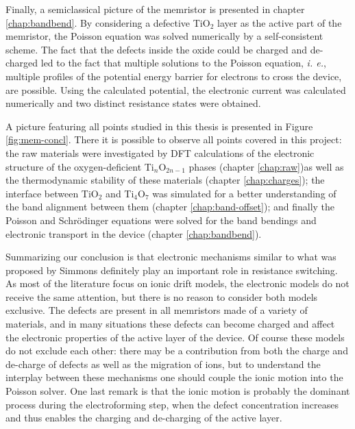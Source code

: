  Finally, a semiclassical picture of the memristor is presented in chapter \ref{chap:bandbend}. By considering a defective TiO$_2$ layer as the active part of the memristor, the Poisson equation was solved numerically by a self-consistent scheme. The fact that the defects inside the oxide could be charged and de-charged led to the fact that multiple solutions to the Poisson equation, \textit{i. e.}, multiple profiles of the potential energy barrier for electrons to cross the device, are possible. Using the calculated potential, the electronic current was calculated numerically and two distinct resistance states were obtained.

 A picture featuring all points studied in this thesis is presented in Figure \ref{fig:mem-concl}. There it is possible to observe all points covered in this project: the raw materials were investigated by DFT calculations of the electronic structure of the oxygen-deficient Ti$_n$O$_{2n-1}$ phases (chapter \ref{chap:raw})as well as the thermodynamic stability of these materials (chapter \ref{chap:charges}); the interface between TiO$_2$ and Ti$_4$O$_7$ was simulated for a better understanding of the band alignment between them (chapter \ref{chap:band-offset}); and finally the Poisson and Schr\"odinger equations were solved for the band bendings and electronic transport in the device (chapter \ref{chap:bandbend}).
 
Summarizing our conclusion is that electronic mechanisms similar to what was proposed by Simmons \cite{Simmons1967} definitely play an important role in resistance switching. As most of the literature focus on ionic drift models, the electronic models do not receive the same attention, but there is no reason to consider both models exclusive. The defects are present in all memristors made of a variety of materials, and in many situations these defects can become charged and affect the electronic properties of the active layer of the device. Of course these models do not exclude each other: there may be a contribution from both the charge and de-charge of defects as well as the migration of ions, but to understand the interplay between these mechanisms one should couple the ionic motion into the Poisson solver. One last remark is that the ionic motion is probably the dominant process during the electroforming step, when the defect concentration increases and thus enables the charging and de-charging of the active layer.

